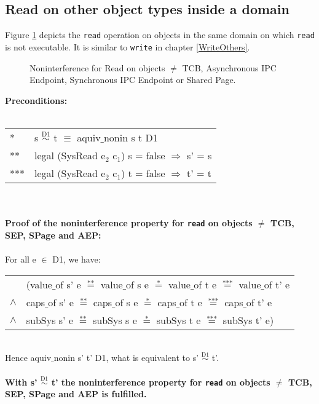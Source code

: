\subsection{Read on other object types inside a domain} 
Figure \ref{fig:ReadOthers} depicts the \texttt{read} operation on objects in the same domain on which \texttt{read} is not executable. It is similar to \texttt{write} in chapter \ref{WriteOthers}.
\begin{figure}[H]
\caption{Noninterference for Read on objects $\neq$ TCB, Asynchronous IPC Endpoint, Synchronous IPC Endpoint or Shared Page.}
\label{fig:ReadOthers}
\end{figure}
\textbf{Preconditions:} \\ \\
\begin{tabular}{ll}
* & s $\overset{\text{D1}}{\sim}$ t $\equiv$ aquiv$\_$nonin s t D1	\\ 
** & legal (SysRead e$_2$ c$_1$) s = false $\Rightarrow$ s' = s \\ 
*** & legal (SysRead e$_2$ c$_1$) t = false $\Rightarrow$ t' = t
\end{tabular} \\ \\ 
\textbf{Proof of the noninterference property for \texttt{read} on objects $\neq$ TCB, SEP, SPage and AEP:}\\ \\
For all e $\in$ D1, we have: \\ 
\begin{tabular}{ll}
& (value$\_$of s' e $\overset{\text{**}}{=}$ value$\_$of s e $\overset{\text{*}}{=}$ value$\_$of t e $\overset{\text{***}}{=}$ value$\_$of t' e \\
$\wedge$ & caps$\_$of s' e $\overset{\text{**}}{=}$ caps$\_$of s e $\overset{\text{*}}{=}$ caps$\_$of t e $\overset{\text{***}}{=}$ caps$\_$of t' e \\
$\wedge$ & subSys s' e $\overset{\text{**}}{=}$ subSys s e $\overset{\text{*}}{=}$ subSys t e $\overset{\text{***}}{=}$ subSys t' e)
\end{tabular} \\
Hence aquiv$\_$nonin s' t' D1, what is equivalent to s' $\overset{\text{D1}}{\sim}$ t'. \\ \\ 
\textbf{With s' $\overset{\text{D1}}{\sim}$ t' the noninterference property for \texttt{read} on objects $\neq$ TCB, SEP, SPage and AEP is fulfilled.}  
